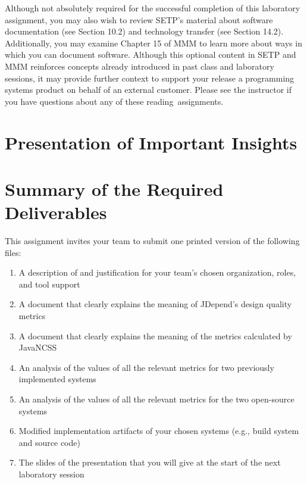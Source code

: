 Although not absolutely required for the successful completion of this laboratory assignment, you may also wish to
review SETP's material about software documentation (see Section 10.2) and technology transfer (see Section 14.2).
Additionally, you may examine Chapter 15 of MMM to learn more about ways in which you can document software. Although
this optional content in SETP and MMM reinforces concepts already introduced in past class and laboratory sessions, it
may provide further context to support your release a programming systems product on behalf of an external customer.
Please see the instructor if you have questions about any of these \mbox{reading assignments}.

\section*{Presentation of Important Insights}

\section*{Summary of the Required Deliverables}

This assignment invites your team to submit one printed version of the following files:
\vspace*{-.1in}
\begin{enumerate}
    \itemsep0em
    \item A description of and justification for your team's chosen organization, roles, and tool support
    \item A document that clearly explains the meaning of JDepend's design quality metrics
    \item A document that clearly explains the meaning of the metrics calculated by JavaNCSS
    \item An analysis of the values of all the relevant metrics for two previously implemented systems
    \item An analysis of the values of all the relevant metrics for the two open-source systems
    \item Modified implementation artifacts of your chosen systems (e.g., build system and source code)
    \item The slides of the presentation that you will give at the start of the next laboratory session
\end{enumerate}
\vspace*{-.1in}

\printbibliography[filter=papers,title={References}]


